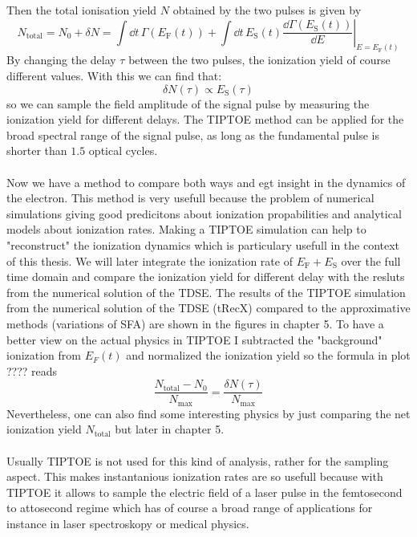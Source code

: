 Then the total ionisation yield $N$ obtained by the two pulses is given by
\begin{equation*}
    N_{\mathrm{total}}=N_0+\delta N = \int \dd t\,\Gamma(E_{\mathrm{F}}(t))+\int \dd t\,E_{\mathrm{S}}(t)\left.\frac{\dd \Gamma(E_{\mathrm{S}}(t))}{\dd E}\right|_{E=E_{\mathrm{F}}(t)}
\end{equation*}
By changing the delay $\tau$ between the two pulses, the ionization yield of course different values.
With this we can find that:
\begin{equation*}
    \delta N(\tau)\propto E_{\mathrm{S}}(\tau)
\end{equation*}
so we can sample the field amplitude of the signal pulse by measuring the ionization yield for different delays.
The TIPTOE method can be applied for the broad spectral range of the signal pulse, as long as the fundamental pulse is shorter than $1.5$ optical cycles.\\\\
Now we have a method to compare both ways and egt insight in the dynamics of the electron. 
This method is very usefull because the problem of numerical simulations giving good predicitons about ionization propabilities and analytical models about ionization rates.
Making a TIPTOE simulation can help to "reconstruct" the ionization dynamics which is particulary usefull in the context of this thesis.
We will later integrate the ionization rate of $E_{\mathrm{F}}+E_{\mathrm{S}}$ over the full time domain and compare the ionization yield for different delay with the resluts from the numerical solution of the TDSE.
The results of the TIPTOE simulation from the numerical solution of the TDSE (tRecX) compared to the approximative methods (variations of SFA) are shown in the figures in chapter 5.
To have a better view on the actual physics in TIPTOE I subtracted the "background" ionization from $E_F(t)$ and normalized the ionization yield so the formula in plot ???? reads
\begin{equation*}
    \frac{N_{\mathrm{total}}-N_0}{N_{\mathrm{max}}}=\frac{\delta N(\tau)}{N_{\mathrm{max}}}
\end{equation*}
Nevertheless, one can also find some interesting physics by just comparing the net ionization yield $N_{\mathrm{total}}$ but later in chapter 5.\\\\
Usually TIPTOE is not used for this kind of analysis, rather for the sampling aspect.
This makes instantanious ionization rates are so usefull because with TIPTOE it allows to sample the electric field of a laser pulse in the femtosecond to attosecond regime which has of course a broad range of applications for instance in laser spectroskopy or medical physics.






